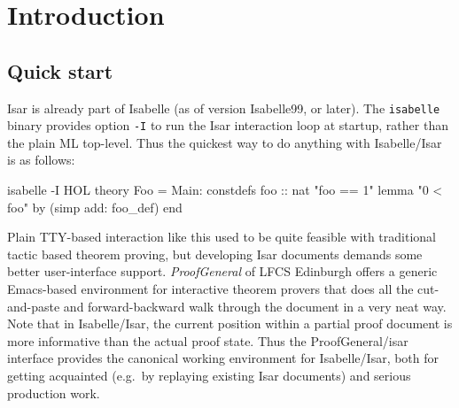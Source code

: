 
\chapter{Introduction}

\section{Quick start}

Isar is already part of Isabelle (as of version Isabelle99, or later).  The
\texttt{isabelle} binary provides option \texttt{-I} to run the Isar
interaction loop at startup, rather than the plain ML top-level.  Thus the
quickest way to do anything with Isabelle/Isar is as follows:
\begin{ttbox}
isabelle -I HOL\medskip
{}\medskip
theory Foo = Main:
constdefs foo :: nat  "foo == 1"
lemma "0 < foo" by (simp add: foo_def)
end
\end{ttbox}

Plain TTY-based interaction like this used to be quite feasible with
traditional tactic based theorem proving, but developing Isar documents
demands some better user-interface support.
\emph{ProofGeneral} of LFCS Edinburgh \cite{proofgeneral}
offers a generic Emacs-based environment for interactive theorem provers that
does all the cut-and-paste and forward-backward walk through the document in a
very neat way.  Note that in Isabelle/Isar, the current position within a
partial proof document is more informative than the actual proof state.  Thus
the ProofGeneral/isar interface provides the canonical working environment for
Isabelle/Isar, both for getting acquainted (e.g.\ by replaying existing Isar
documents) and serious production work.

\medskip

